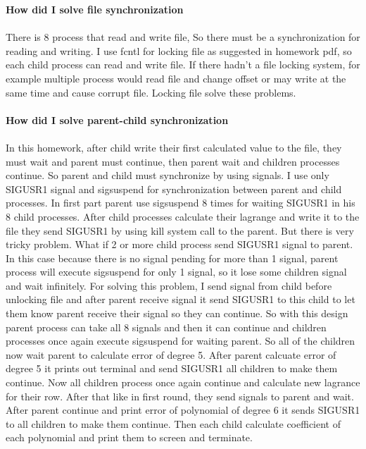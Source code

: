 \documentclass{article}
\begin{document}
\newpage
\textbf{
How did I solve file synchronization} \\
\\
There is 8 process that read and write file, So there must be a synchronization for reading and writing. I use fcntl for locking file as suggested in homework pdf, so each child process can read and write file. If there hadn't a file locking system, for example multiple process would read file and change offset or may write at the same time and cause corrupt file. Locking file solve these problems.
\\
\\
\textbf{
How did I solve parent-child synchronization} \\
\\
In this homework, after child write their first calculated value to the file, they must wait and parent must continue, then parent wait and children processes continue. So parent and child must synchronize by using signals. I use only SIGUSR1 signal and sigsuspend for synchronization between parent and child processes. In first part parent use sigsuspend 8 times for waiting SIGUSR1 in his 8 child processes. After child processes calculate their lagrange and write it to the file they send SIGUSR1 by using kill system call to the parent. But there is very tricky problem. What if 2 or more child process send SIGUSR1 signal to parent. In this case because there is no signal pending for more than 1 signal, parent process will execute sigsuspend for only 1 signal, so it lose some children signal and wait infinitely. For solving this problem, I send signal from child before unlocking file and after parent receive signal it send SIGUSR1 to this child to let them know parent receive their signal so they can continue. So with this design parent process can take all 8 signals and then it can continue and children processes once again execute sigsuspend for waiting parent. So all of the children now wait parent to calculate error of degree 5. After parent calcuate error of degree 5 it prints out terminal and send SIGUSR1 all children to make them continue. Now all children process once again continue and calculate new lagrance for their row. After that like in first round, they send signals to parent and wait. After parent continue and print error of polynomial of degree 6 it sends SIGUSR1 to all children to make them continue. Then each child calculate coefficient of each polynomial and print them to screen and terminate.
\\
\end{document}
